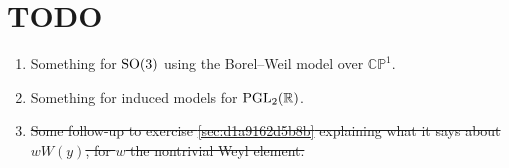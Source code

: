 \documentclass[reqno]{amsart} 
\numberwithin{equation}{section}
\begin{document}
\section{TODO}

\begin{enumerate}
\item Something for $\operatorname{SO}(3)$ using the Borel--Weil model over $\mathbb{C} \mathbb{P}^1$.
\item Something for induced models for $\operatorname{PGL}_2(\mathbb{R})$.
\item \sout{Some follow-up to exercise \ref{sec:d1a9162d5b8b} explaining what it says about $w W(y)$, for $w$ the nontrivial Weyl element.}
\end{enumerate}



{} 
\end{document}
